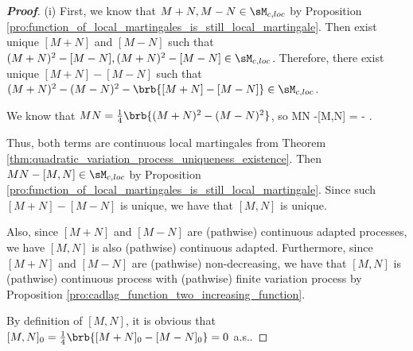 \begin{proof}[\bf Proof]
\ben
\item [(i)] First, we know that $M+N,M-N\in \sM_{c,loc}$ by Proposition \ref{pro:function_of_local_martingales_is_still_local_martingale}. Then exist unique $[M+N]$ and $[M-N]$ such that $(M+N)^2 - [M-N],(M+N)^2 - [M-N]\in \sM_{c,loc}$. Therefore, there exist unique $[M+N]-[M-N]$ such that $(M+N)^2-(M-N)^2 - \brb{[M+N]-[M-N]} \in \sM_{c,loc}$.

We know that $M N = \frac 14\brb{(M+N)^2-(M-N)^2}$, so
\be
MN -[M,N] =  - .
\ee

Thus, both terms are continuous local martingales from Theorem \ref{thm:quadratic_variation_process_uniqueness_existence}. Then $MN -[M,N]\in \sM_{c,loc}$ by Proposition \ref{pro:function_of_local_martingales_is_still_local_martingale}. %
Since such $[M+N]-[M-N]$ is unique, we have that $[M,N]$ is unique. %

Also, since $[M+N]$ and $[M-N]$ are (pathwise) continuous adapted processes, we have $[M,N]$ is also (pathwise) continuous adapted. Furthermore, since $[M+N]$ and $[M-N]$ are (pathwise) non-decreasing, we have that $[M,N]$ is (pathwise) continuous process with (pathwise) finite variation process by Proposition \ref{pro:cadlag_function_two_increasing_function}.

By definition of $[M,N]$, it is obvious that $[M,N]_0 = \frac 14 \brb{[M+N]_0 - [M-N]_0} = 0$ a.s..



\end{proof}

